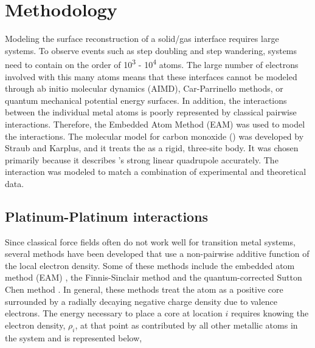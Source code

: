 \section{Methodology}
Modeling the surface reconstruction of a solid/gas interface requires large
systems.  To observe events such as step doubling and step wandering, systems
need to contain on the order of 10\textsuperscript{3} - 10\textsuperscript{4}
atoms. The large number of electrons involved with this many atoms means that
these interfaces cannot be modeled through ab initio molecular dynamics
(AIMD),\citep{Kresse:1993qf, Kresse:1993ve, Kresse:1994ul} Car-Parrinello
methods, \citep{Car:1985bh, Izvekov:2000fv, Guidelli:2000fy} or quantum
mechanical potential energy surfaces.  In addition, the interactions between
the individual metal atoms is poorly represented by classical pairwise
interactions.  Therefore, the Embedded Atom Method (EAM) \citep{Foiles:1986ky}
was used to model the  interactions.  The molecular model for
carbon monoxide () was developed by Straub and
Karplus,\citep{Straub:1991no} and it treats the  as a rigid, three-site
body. It was chosen primarily because it describes 's strong linear
quadrupole accurately.  The  interaction was modeled to match
a combination of experimental \citep{Yeo:1997th, Ertl:1977cg, Kelemen:1979ad}
and theoretical \citep{Deshlahra:2012aa, Korzeniewski:1986kl, Beurden:2002ys,
Deshlahra:2009wu, Feibelman:2001qa, Mason:2004ix} data. 

\subsection{Platinum-Platinum interactions}
Since classical force fields often do not work well for transition metal
systems, several methods have been developed that use a non-pairwise additive
function of the local electron density.  Some of these methods include the
embedded atom method (EAM) \citep{Foiles:1986ky, Daw:1984aq, Johnson:1989yr,
Daw:1989ci, Plimpton:1993qi, Lu:1997fv, Alemany:1998fp, Voter:1995ax}, the
Finnis-Sinclair method \citep{Finnis:1984hl, Sutton:1990rr} and the
quantum-corrected Sutton Chen method \citep{Qi:1999dn}.  In general, these
methods treat the atom as a positive core surrounded by a radially decaying
negative charge density due to valence electrons.  The energy necessary to
place a core at location $i$ requires knowing the electron density, $\rho_i$,
at that point as contributed by all other metallic atoms in the system and is
represented below, 

